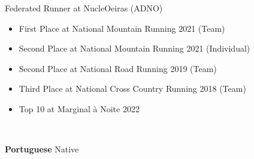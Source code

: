 \documentclass[10pt,a4paper,ragged2e,withhyper]{altacv}
\begin{document}
\begin{paracol}{2}
Federated Runner at NucleOeiras (ADNO)

\begin{itemize}

\item First Place at National Mountain Running 2021 (Team)
\item Second Place at National Mountain Running 2021 (Individual)
\item Second Place at National Road Running 2019 (Team)
\item Third Place at National Cross Country Running 2018 (Team)
\item Top 10 at Marginal à Noite 2022 

\end{itemize}











\divider




\switchcolumn


\\


	\vspace{1.2mm}
	\small \textbf{Portuguese} \hfill {Native \hspace{3pt}} \\
	

\end{paracol}
\end{document}
